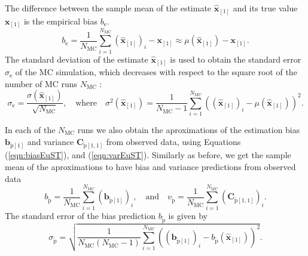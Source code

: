 The difference between the sample mean of the estimate $\widehat{\mathbf{x}}_{\left[1\right]}$ and its true value $\mathbf{x}_{\left[1\right]}$ is the empirical bias $b_\mathrm{e}$.
\begin{equation} {b}_\mathrm{e} = \frac{1}{N_{\mathrm{MC}}} \sum_{i=1}^{N_{\mathrm{MC}}}{ \left( \widehat{\mathbf{x}}_{\left[1\right]} \right)_i -  \mathbf{x}_{\left[1\right]} } \approx \mu \left( \widehat{\mathbf{x}}_{\left[1\right]} \right) - \mathbf{x}_{\left[1\right]} . \end{equation}
The standard deviation of the estimate $\widehat{\mathbf{x}}_{\left[1\right]}$ is used to obtain the standard error $\sigma_\mathrm{e}$ of the MC simulation, which decreases with respect to the square root of the number of MC runs $N_{\mathrm{MC}}$ \citep{Hammersley75}: 
\begin{equation} \sigma_\mathrm{e} = \frac{ \sigma \left( \widehat{\mathbf{x}}_{\left[1\right]} \right) }{\sqrt{N_{\mathrm{MC}}}}, \quad \mathrm{where} \quad \sigma^2 \left( \widehat{\mathbf{x}}_{\left[1\right]} \right) = \frac{1}{N_{\mathrm{MC}}-1} \sum_{i=1}^{N_{\mathrm{MC}}}{ \left( \left( \widehat{\mathbf{x}}_{\left[1\right]} \right)_i - \mu \left( \widehat{\mathbf{x}}_{\left[1\right]} \right) \right)^2 } . \label{eqn:stderr} \end{equation}

In each of the $N_{\mathrm{MC}}$ runs we also obtain the aproximations of the estimation bias $\mathbf{b}_{\widetilde{\mathrm{p}} \left[1\right]}$ and variance $\mathbf{C}_{\widetilde{\mathrm{p}} \left[1,1\right]}$  from observed data, using Equations (\ref{eqn:biasEuST}), and (\ref{eqn:varEuST}).
Similarly as before, we get the sample mean of the aproximations to have bias and variance predictions from observed data 
 \begin{equation} b_{\widetilde{\mathrm{p}}} = \frac{1}{N_{\mathrm{MC}}} \sum_{i=1}^{N_{\mathrm{MC}}}{ \left( \mathbf{b}_{\widetilde{\mathrm{p}} \left[1\right]} \right)_i } , \quad \mathrm{and} 
 \quad v_{\widetilde{\mathrm{p}}}  = \frac{1}{N_{\mathrm{MC}}} \sum_{i=1}^{N_{\mathrm{MC}}}{ \left( \mathbf{C}_{\widetilde{\mathrm{p}} \left[1,1\right]} \right)_i } . \end{equation} 
The standard error of the bias prediction $b_{\widetilde{\mathrm{p}}}$ is given by
\begin{equation} \sigma_{\widetilde{\mathrm{p}}} = \sqrt{ \frac{1}{N_{\mathrm{MC}} \left( N_{\mathrm{MC}}-1 \right)} \sum_{i=1}^{N_{\mathrm{MC}}} { \left( \left( \mathbf{b}_{\widetilde{\mathrm{p}} \left[1\right]} \right)_i - b_{\widetilde{\mathrm{p}}} \left( \widehat{\mathbf{x}}_{\left[1\right]} \right) \right)^2 } } . \end{equation}

